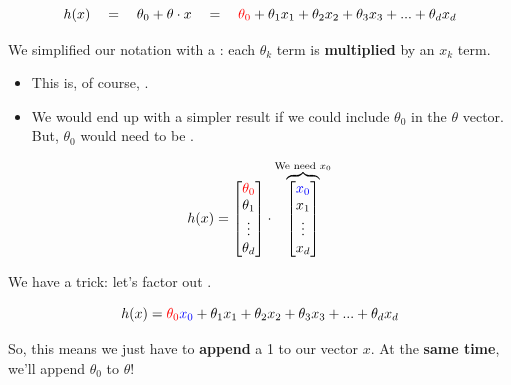         \begin{equation}
            h(x) \quad=\quad 
             \theta_0  + \theta \cdot x
            \quad=\quad 
            \textcolor{red}{\theta_0} + \theta_1x_1 + \theta_2x_2 + \theta_3x_3 + ... + \theta_dx_d
        \end{equation}
        
            We simplified our notation with a : each $\theta_k$ term is \textbf{multiplied} by an $x_k$ term.

        \begin{itemize}
            \item This is, of course, .
            \item We would end up with a simpler result if we could include $\theta_0$ in the $\theta$ vector. But, $\theta_0$ would need to be .
        \end{itemize}

        \begin{equation}
            h(x) = 
            \begin{bmatrix}
                \textcolor{red}{\theta_0} \\ \theta_1 \\ \vdots \\ \theta_d 
            \end{bmatrix}
            \cdot
            \overbrace{
            \begin{bmatrix}
                \textcolor{blue}{x_0} \\ x_1 \\ \vdots \\ x_d
            \end{bmatrix}
            }^{\text{We need $x_0$}}
        \end{equation}
        
        We have a trick: let's factor out .
        
        
        \begin{equation}
            h(x) = \textcolor{red}{\theta_0}\textcolor{blue}{x_0} + \theta_1x_1 + \theta_2x_2 + \theta_3x_3 + ... + \theta_dx_d
        \end{equation}
        
        So, this means we just have to \textbf{append} a 1 to our vector $x$. At the \textbf{same time}, we'll append $\theta_0$ to $\theta$!
        
